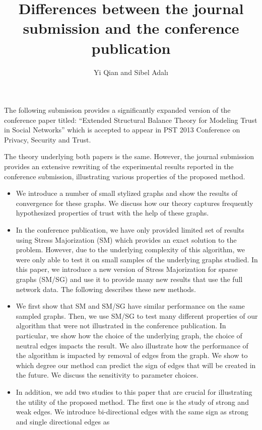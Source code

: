 \documentclass[11pt]{article}
\title{Differences between the journal submission and the conference publication}
\author{Yi Qian and Sibel Adal{\i}}
\date{}
\begin{document}
\maketitle

The following submission provides a significantly expanded version of
the conference paper titled: ``Extended Structural Balance Theory for
Modeling Trust in Social Networks'' which is accepted to appear in PST
2013 Conference on Privacy, Security and Trust.

The theory underlying both papers is the same. However, the journal
submission provides an extensive rewriting of the experimental results
reported in the conference submission, illustrating various properties
of the proposed method.

\begin{itemize}
\item We introduce a number of small stylized graphs and show the
  results of convergence for these graphs. We discuss how our theory
  captures frequently hypothesized properties of trust with the help
  of these graphs.
\item In the conference publication, we have only provided limited set
  of results using Stress Majorization (SM) which provides an exact
  solution to the problem. However, due to the underlying complexity
  of this algorithm, we were only able to test it on small samples of
  the underlying graphs studied. In this paper, we introduce a new
  version of Stress Majorization for sparse graphs (SM/SG) and use it
  to provide many new results that use the full network data. The
  following describes these new methods.
\item We first show that SM and SM/SG have similar performance on the
  same sampled graphs. Then, we use SM/SG to test many different
  properties of our algorithm that were not illustrated in the
  conference publication. In particular, we show how the choice of the
  underlying graph, the choice of neutral edges impacts the result. We
  also illustrate how the performance of the algorithm is impacted by
  removal of edges from the graph. We show to which degree our method
  can predict the sign of edges that will be created in the future. We
  discuss the sensitivity to parameter choices. 
\item In addition, we add two studies to this paper that are crucial
  for illustrating the utility of the proposed method. The first one
  is the study of strong and weak edges. We introduce bi-directional
  edges with the same sign as strong and single directional edges as

\end{itemize}
\end{document}
